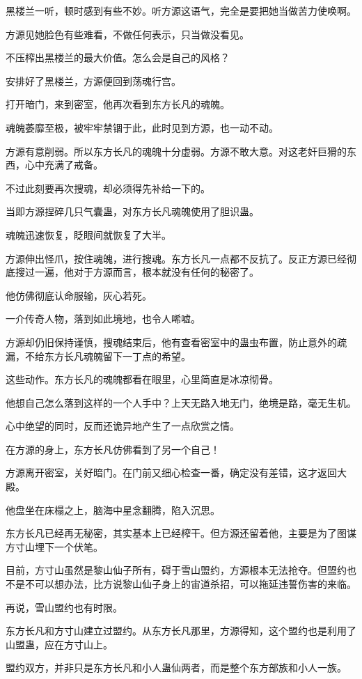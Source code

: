 \begin{this_body}
黑楼兰一听，顿时感到有些不妙。听方源这语气，完全是要把她当做苦力使唤啊。

方源见她脸色有些难看，不做任何表示，只当做没看见。

不压榨出黑楼兰的最大价值。怎么会是自己的风格？

安排好了黑楼兰，方源便回到荡魂行宫。

打开暗门，来到密室，他再次看到东方长凡的魂魄。

魂魄萎靡至极，被牢牢禁锢于此，此时见到方源，也一动不动。

方源有意削弱。所以东方长凡的魂魄十分虚弱。方源不敢大意。对这老奸巨猾的东西，心中充满了戒备。

不过此刻要再次搜魂，却必须得先补给一下的。

当即方源捏碎几只气囊蛊，对东方长凡魂魄使用了胆识蛊。

魂魄迅速恢复，眨眼间就恢复了大半。

方源伸出怪爪，按住魂魄，进行搜魂。东方长凡一点都不反抗了。反正方源已经彻底搜过一遍，他对于方源而言，根本就没有任何的秘密了。

他仿佛彻底认命服输，灰心若死。

一介传奇人物，落到如此境地，也令人唏嘘。

方源却仍旧保持谨慎，搜魂结束后，他有查看密室中的蛊虫布置，防止意外的疏漏，不给东方长凡魂魄留下一丁点的希望。

这些动作。东方长凡的魂魄都看在眼里，心里简直是冰凉彻骨。

他想自己怎么落到这样的一个人手中？上天无路入地无门，绝境是路，毫无生机。

心中绝望的同时，反而还诡异地产生了一点欣赏之情。

在方源的身上，东方长凡仿佛看到了另一个自己！

方源离开密室，关好暗门。在门前又细心检查一番，确定没有差错，这才返回大殿。

他盘坐在床榻之上，脑海中星念翻腾，陷入沉思。

东方长凡已经再无秘密，其实基本上已经榨干。但方源还留着他，主要是为了图谋方寸山埋下一个伏笔。

目前，方寸山虽然是黎山仙子所有，碍于雪山盟约，方源根本无法抢夺。但盟约也不是不可以想办法，比方说黎山仙子身上的宙道杀招，可以拖延违誓伤害的来临。

再说，雪山盟约也有时限。

东方长凡和方寸山建立过盟约。从东方长凡那里，方源得知，这个盟约也是利用了山盟蛊，应在方寸山上。

盟约双方，并非只是东方长凡和小人蛊仙两者，而是整个东方部族和小人一族。


\end{this_body}
